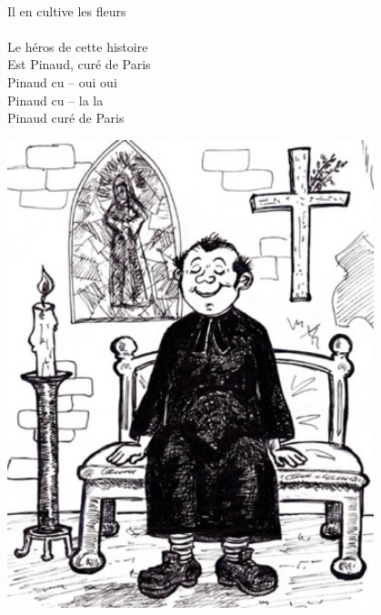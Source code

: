 \\Il en cultive les fleurs
\\\\Le héros de cette histoire
\\Est Pinaud, curé de Paris
\\Pinaud cu -- oui oui
\\Pinaud cu -- la la
\\Pinaud curé de Paris
\\
\begin{center}
\includegraphics[width=0.8\textwidth]{images/cure_paris.jpg}
\end{center}

\breakpage